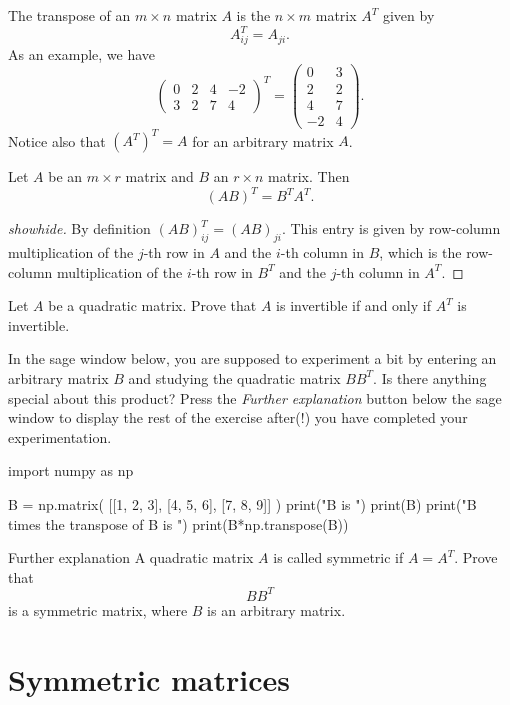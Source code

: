 \documentclass{article}
\begin{document}
The transpose of an $m\times n$ matrix $A$ is the $n\times m$ matrix $A^T$ given by
$$
A^T_{i j} = A_{j i}.
$$
As an example, we have
$$
\begin{pmatrix}
0 & 2 & 4 & -2\\
3 & 2 & 7 & 4
\end{pmatrix}^T =
\begin{pmatrix}
0 & 3\\
2 & 2\\
4 & 7\\
-2 & 4
\end{pmatrix}.
$$
Notice also that $(A^T)^T = A$ for an arbitrary matrix $A$.

\begin{proposition}\label{prop:transformel}
Let $A$ be an $m\times r$ matrix and $B$ an $r\times n$ matrix. Then
$$
(A B)^T = B^T A^T.
$$
\end{proposition}
\begin{proof}[showhide]
  By definition $(A B)^T_{i j} = (A B)_{j i}$. This entry is given
  by row-column multiplication of the $j$-th row in $A$ and 
the $i$-th column in  $B$, which is the row-column multiplication of the
$i$-th row  in $B^T$ and the $j$-th column  in $A^T$.
\end{proof}

\beginshex
Let $A$ be a quadratic matrix. Prove that $A$ is invertible if and only if
$A^T$ is invertible.
\endshex

\beginshex In the sage window below, you are supposed to experiment a
bit by entering an arbitrary matrix $B$ and studying the quadratic
matrix $B B^T$. Is there anything special about this product?  Press
the \emph{Further explanation} button below the sage window to display
the rest of the exercise after(!) you have completed your
experimentation.

\begin{sage}
import numpy as np

B = np.matrix( [[1, 2, 3], [4, 5, 6], [7, 8, 9]] )
print("B is ")
print(B)
print("B times the transpose of B is ")
print(B*np.transpose(B))
\end{sage}

\begin{hideinbutton}{Further explanation}
  A quadratic matrix $A$ is called symmetric if $A = A^T$. Prove that
$$
B B^T
$$
is a symmetric matrix, where $B$ is an arbitrary matrix.
\end{hideinbutton}
\endshex

\section{Symmetric matrices}\label{Sectionsymmat}
\end{document}
